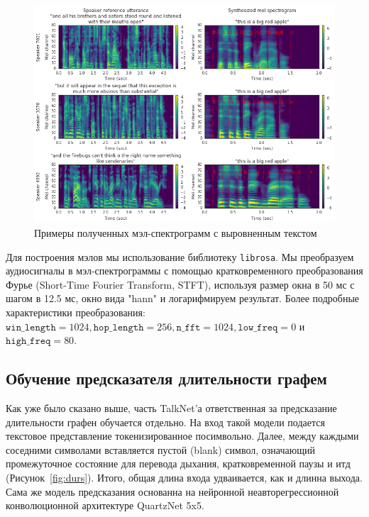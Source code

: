\begin{figure}[!ht]
\centering
\includegraphics[width=1.0\textwidth]{images/mel-example.png}
\caption{Примеры полученных мэл-спектрограмм с выровненным текстом}
\label{fig:mel-example}
\end{figure}

Для построения мэлов мы использование библиотеку \texttt{librosa}. Мы преобразуем аудиосигналы в мэл-спектрограммы с помощью кратковременного преобразования Фурье (Short-Time Fourier Transform, STFT), используя размер окна в 50 мс с шагом в 12.5 мс, окно вида "hann" и логарифмируем результат. Более подробные характеристики преобразования: $\texttt{win\_length}=1024, \texttt{hop\_length}=256, \texttt{n\_fft}=1024, \texttt{low\_freq}=0$ и $\texttt{high\_freq}=80$.

\subsection{Обучение предсказателя длительности графем}

Как уже было сказано выше, часть TalkNet'а ответственная за предсказание длительности графен обучается отдельно. На вход такой модели подается текстовое представление токенизированное посимвольно. Далее, между каждыми соседними символами вставляется пустой (blank) символ, означающий промежуточное состояние для перевода дыхания, кратковременной паузы и итд (Рисунок~\ref{fig:durs}). Итого, общая длина входа удваивается, как и длинна выхода. Сама же модель предсказания основанна на нейронной неавторегрессионной конволюционной архитектуре QuartzNet 5x5.

